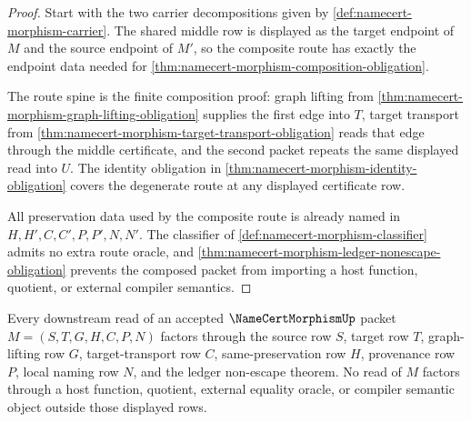 \begin{proof}
Start with the two carrier decompositions given by \autoref{def:namecert-morphism-carrier}. The shared middle row is displayed as the target endpoint of $M$ and the source endpoint of $M'$, so the composite route has exactly the endpoint data needed for \autoref{thm:namecert-morphism-composition-obligation}.

The route spine is the finite composition proof: graph lifting from \autoref{thm:namecert-morphism-graph-lifting-obligation} supplies the first edge into $T$, target transport from \autoref{thm:namecert-morphism-target-transport-obligation} reads that edge through the middle certificate, and the second packet repeats the same displayed read into $U$. The identity obligation in \autoref{thm:namecert-morphism-identity-obligation} covers the degenerate route at any displayed certificate row.

All preservation data used by the composite route is already named in $H,H',C,C',P,P',N,N'$. The classifier of \autoref{def:namecert-morphism-classifier} admits no extra route oracle, and \autoref{thm:namecert-morphism-ledger-nonescape-obligation} prevents the composed packet from importing a host function, quotient, or external compiler semantics.
\end{proof}

\begin{theorem}
\label{thm:namecert-morphism-ledger-boundary-exactness}
Every downstream read of an accepted $\NameCertMorphismUp$ packet $M=(S,T,G,H,C,P,N)$ factors through the source row $S$, target row $T$, graph-lifting row $G$, target-transport row $C$, same-preservation row $H$, provenance row $P$, local naming row $N$, and the ledger non-escape theorem. No read of $M$ factors through a host function, quotient, external equality oracle, or compiler semantic object outside those displayed rows.
\end{theorem}

